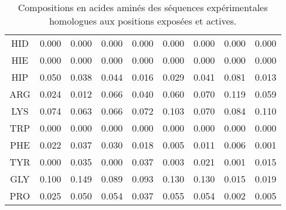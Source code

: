 \begin{table}[!htbp]
\begin{tabular}{ccccccccc}
        \cmidrule{1-9}
   HID  & 0.000  &  0.000  &   0.000  &   0.000  &   0.000 &   0.000  &   0.000  &   0.000 \\                                         
   HIE  & 0.000  &  0.000  &   0.000  &   0.000  &   0.000 &   0.000  &   0.000  &   0.000 \\                                         
   HIP  & 0.050  &  0.038  &   0.044  &   0.016  &   0.029 &   0.041  &   0.081  &   0.013 \\                                        
        \cmidrule{1-9}
   ARG  & 0.024  &  0.012  &   0.066  &   0.040  &   0.060 &   0.070  &   0.119  &   0.059 \\                                          
        \cmidrule{1-9}
   LYS  & 0.074  &  0.063  &   0.066  &   0.072  &   0.103 &   0.070  &   0.084  &   0.110 \\                                          
        \cmidrule{1-9}
   TRP  & 0.000  &  0.000  &   0.000  &   0.000  &   0.000 &   0.000  &   0.000  &   0.000 \\                                         
        \cmidrule{1-9}
   PHE  & 0.022  &  0.037  &   0.030  &   0.018  &   0.005 &   0.011  &   0.006  &   0.001 \\                                         
        \cmidrule{1-9}
   TYR  & 0.000  &  0.035  &   0.000  &   0.037  &   0.003 &   0.021  &   0.001  &   0.015 \\
        \cmidrule{1-9}
   GLY  & 0.100  &  0.149  &   0.089  &   0.093  &   0.130 &   0.130  &   0.015  &   0.019 \\                                            
   PRO  & 0.025  &  0.050  &   0.054  &   0.037  &   0.055 &   0.054  &   0.002  &   0.005 \\                                         
        \bottomrule


      \end{tabular}      
      \caption{Compositions en acides aminés des séquences expérimentales homologues aux positions exposées et actives.}
\label{tab:freq_AA_ALL}      
    \end{table}


    \clearpage


